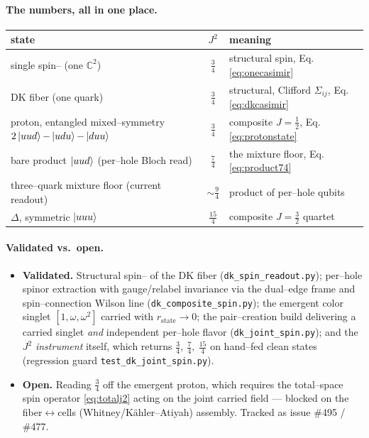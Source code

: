 \documentclass[11pt,oneside]{article}
\newcommand{\C}{\mathbb{C}}
\newcommand{\code}[1]{\texttt{#1}}
\begin{document}
\paragraph{The numbers, all in one place.}
\begin{center}
\renewcommand{\arraystretch}{1.3}
\begin{tabular}{l c l}
\toprule
state & $J^2$ & meaning \\
\midrule
single spin--\textonehalf{} (one $\C^2$) & $\tfrac34$ & structural spin, Eq.\eqref{eq:onecasimir} \\
DK fiber (one quark) & $\tfrac34$ & structural, Clifford $\Sigma_{ij}$, Eq.\eqref{eq:dkcasimir} \\
proton, entangled mixed--symmetry $2\ket{uud}{-}\ket{udu}{-}\ket{duu}$ & $\tfrac34$ & composite $J=\tfrac12$, Eq.\eqref{eq:protonstate} \\
bare product $\ket{uud}$ (per--hole Bloch read) & $\tfrac74$ & the mixture floor, Eq.\eqref{eq:product74} \\
three--quark mixture floor (current readout) & $\sim\tfrac94$ & product of per--hole qubits \\
$\Delta$, symmetric $\ket{uuu}$ & $\tfrac{15}{4}$ & composite $J=\tfrac32$ quartet \\
\bottomrule
\end{tabular}
\end{center}

\paragraph{Validated vs.\ open.}
\begin{itemize}[leftmargin=1.6em]
  \item \textbf{Validated.} Structural spin--\textonehalf{} of the DK fiber
        (\code{dk\_spin\_readout.py}); per--hole spinor extraction with
        gauge/relabel invariance via the dual--edge frame and spin--connection
        Wilson line (\code{dk\_composite\_spin.py}); the emergent color singlet
        $[1,\omega,\omega^2]$ carried with $r_{\text{state}}\to0$; the
        pair--creation build delivering a carried singlet \emph{and} independent
        per--hole flavor (\code{dk\_joint\_spin.py}); and the $J^2$ \emph{instrument}
        itself, which returns $\tfrac34,\ \tfrac74,\ \tfrac{15}{4}$ on
        hand--fed clean states (regression guard \code{test\_dk\_joint\_spin.py}).
  \item \textbf{Open.} Reading $\tfrac34$ off the emergent proton, which requires
        the total--space spin operator \eqref{eq:totalj2} acting on the joint
        carried field --- blocked on the fiber$\leftrightarrow$cells
        (Whitney/K\"ahler--Atiyah) assembly. Tracked as issue \#495 / \#477.
\end{itemize}
\end{document}

